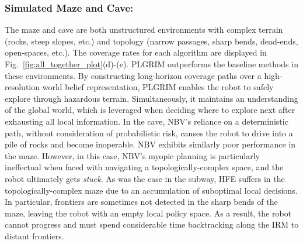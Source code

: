 \documentclass[letterpaper]{article} %
\begin{document}
%
\subsubsection{Simulated Maze and Cave:} \hfill
\vspace{-0.25pt}

\noindent
The maze and cave are both unstructured environments with complex terrain (rocks, steep slopes, etc.) and topology (narrow passages, sharp bends, dead-ends, open-spaces, etc.).
The coverage rates for each algorithm are displayed in Fig.~\ref{fig:all_together_plot}(d)-(e). 
%
PLGRIM outperforms the baseline methods in these environments. By constructing long-horizon coverage paths over a high-resolution world belief representation,
PLGRIM enables the robot to safely explore through hazardous terrain. 
Simultaneously, it maintains an understanding of the global world, which is leveraged when deciding where to explore next after exhausting all local information.
%
In the cave, NBV's reliance on a deterministic path, without consideration of probabilistic risk, causes the robot to drive into a pile of rocks and become inoperable. NBV exhibits similarly poor performance in the maze. However, in this case, NBV's myopic planning is particularly ineffectual when faced with navigating a topologically-complex space, and the robot ultimately gets \textit{stuck}.   
%
As was the case in the subway, HFE suffers in the topologically-complex maze due to an accumulation of suboptimal local decisions. In particular, frontiers are sometimes not detected in the sharp bends of the maze, leaving the robot with an empty local policy space. As a result, the robot cannot progress and must spend considerable time backtracking along the IRM to distant frontiers.  
\end{document}
